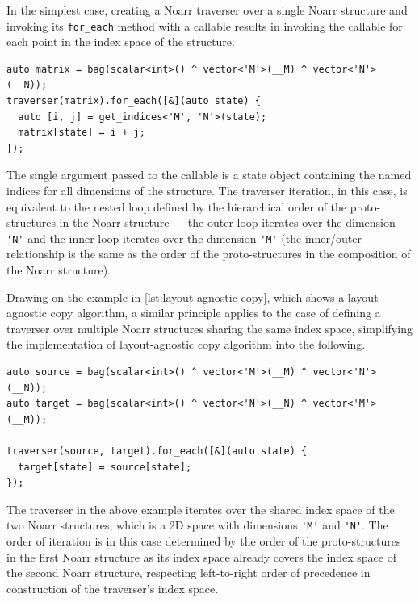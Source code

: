 In the simplest case, creating a Noarr traverser over a single Noarr structure and invoking its \lstinline{for_each} method with a callable results in invoking the callable for each point in the index space of the structure.

\begin{lstlisting}[style=C++, caption={Creating and using a Noarr traverser over a single structure.}, label=lst:noarr-traverser-single-structure, basicstyle=\ttfamily\scriptsize]
auto matrix = bag(scalar<int>() ^ vector<'M'>(__M) ^ vector<'N'>(__N));
traverser(matrix).for_each([&](auto state) {
  auto [i, j] = get_indices<'M', 'N'>(state);
  matrix[state] = i + j;
});
\end{lstlisting}

The single argument passed to the callable is a state object containing the named indices for all dimensions of the structure. The traverser iteration, in this case, is equivalent to the nested loop defined by the hierarchical order of the proto-structures in the Noarr structure --- the outer loop iterates over the dimension \lstinline{'N'} and the inner loop iterates over the dimension \lstinline{'M'} (the inner/outer relationship is the same as the order of the proto-structures in the composition of the Noarr structure).

Drawing on the example in \cref{lst:layout-agnostic-copy}, which shows a layout-agnostic copy algorithm, a similar principle applies to the case of defining a traverser over multiple Noarr structures sharing the same index space, simplifying the implementation of layout-agnostic copy algorithm into the following.

\begin{lstlisting}[style=C++,basicstyle=\ttfamily\scriptsize]
auto source = bag(scalar<int>() ^ vector<'M'>(__M) ^ vector<'N'>(__N));
auto target = bag(scalar<int>() ^ vector<'N'>(__N) ^ vector<'M'>(__M));

traverser(source, target).for_each([&](auto state) {
  target[state] = source[state];
});
\end{lstlisting}

The traverser in the above example iterates over the shared index space of the two Noarr structures, which is a 2D space with dimensions \lstinline{'M'} and \lstinline{'N'}. The order of iteration is in this case determined by the order of the proto-structures in the first Noarr structure as its index space already covers the index space of the second Noarr structure, respecting left-to-right order of precedence in construction of the traverser's index space.

